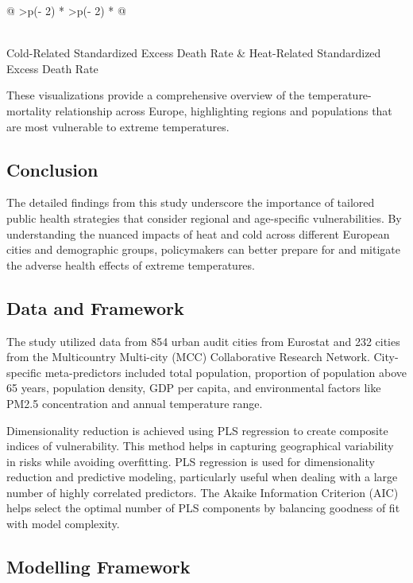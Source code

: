 \documentclass[
]{krantz}
\begin{document}
\begin{longtable}[]{@{}
  >{\centering\arraybackslash}p{(\columnwidth - 2\tabcolsep) * }
  >{\centering\arraybackslash}p{(\columnwidth - 2\tabcolsep) * }@{}}
\begin{minipage}[b]{\linewidth}
\end{minipage} \\
\midrule\noalign{}
\endhead
\bottomrule\noalign{}
\endlastfoot
Cold-Related Standardized Excess Death Rate & Heat-Related Standardized Excess Death Rate \\
\end{longtable}

These visualizations provide a comprehensive overview of the temperature-mortality relationship across Europe, highlighting regions and populations that are most vulnerable to extreme temperatures.

\subsection{Conclusion}\label{conclusion-5}

The detailed findings from this study underscore the importance of tailored public health strategies that consider regional and age-specific vulnerabilities. By understanding the nuanced impacts of heat and cold across different European cities and demographic groups, policymakers can better prepare for and mitigate the adverse health effects of extreme temperatures.

\subsection{Data and Framework}\label{data-and-framework}

The study utilized data from 854 urban audit cities from Eurostat and 232 cities from the Multicountry Multi-city (MCC) Collaborative Research Network. City-specific meta-predictors included total population, proportion of population above 65 years, population density, GDP per capita, and environmental factors like PM2.5 concentration and annual temperature range.

Dimensionality reduction is achieved using PLS regression to create composite indices of vulnerability. This method helps in capturing geographical variability in risks while avoiding overfitting. PLS regression is used for dimensionality reduction and predictive modeling, particularly useful when dealing with a large number of highly correlated predictors. The Akaike Information Criterion (AIC) helps select the optimal number of PLS components by balancing goodness of fit with model complexity.

\subsection{Modelling Framework}\label{modelling-framework}
\end{document}
